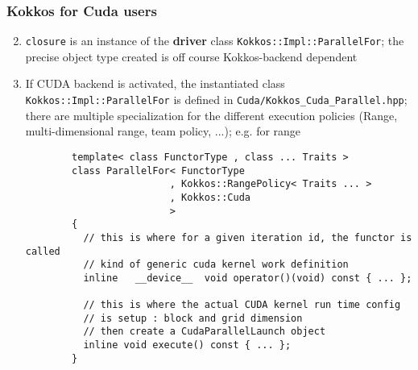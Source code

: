 \begin{frame}[fragile=singleslide]
  \frametitle{Kokkos for Cuda users}

  
  \begin{enumerate}
    \setcounter{enumi}{1}
  \item \texttt{closure} is an instance of the {\bf driver} class \texttt{Kokkos::Impl::ParallelFor}; the precise object type created is off course Kokkos-backend dependent
  \item If CUDA backend is activated, the instantiated class \texttt{Kokkos::Impl::ParallelFor} is defined in \texttt{Cuda/Kokkos\_Cuda\_Parallel.hpp}; there are multiple specialization for the different execution policies (Range, multi-dimensional range, team policy, ...); e.g. for range
    {\scriptsize
      \begin{verbatim}
        template< class FunctorType , class ... Traits >
        class ParallelFor< FunctorType
                         , Kokkos::RangePolicy< Traits ... >
                         , Kokkos::Cuda
                         >
        {
          // this is where for a given iteration id, the functor is called
          // kind of generic cuda kernel work definition
          inline   __device__  void operator()(void) const { ... };
          
          // this is where the actual CUDA kernel run time config
          // is setup : block and grid dimension
          // then create a CudaParallelLaunch object
          inline void execute() const { ... };
        }

      \end{verbatim}
  }
  \end{enumerate}

\end{frame}


